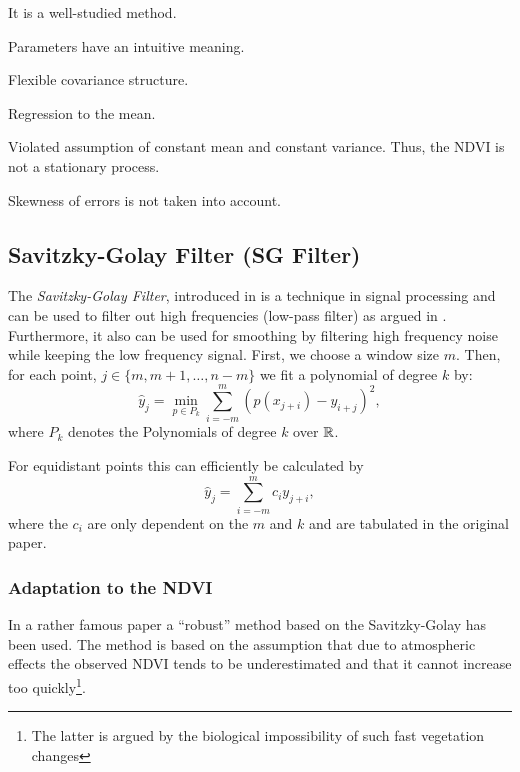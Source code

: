 \begin{my_pros_cons_table}{
    \item It is a well-studied method.
    \item Parameters have an intuitive meaning.
    \item Flexible covariance structure.
  }{
    \item Regression to the mean.
    \item Violated assumption of constant mean and constant variance. Thus, the NDVI is not a stationary process.
    \item Skewness of errors is not taken into account.
  }
\end{my_pros_cons_table}


\subsection{Savitzky-Golay Filter (SG Filter)}
\label{sec:Savitzky–Golay}
The \textit{Savitzky-Golay Filter}, introduced in \cite{savitzkySmoothingDifferentiationData1964} is a technique in signal processing and can be used to filter out high frequencies (low-pass filter) as argued in \cite{schaferWhatSavitzkyGolayFilter2011}. Furthermore, it also can be used for smoothing by filtering high frequency noise while keeping the low frequency signal.
First, we choose a window size $m$. Then, for each point, $j \in \{m, m+1, \dots, n-m\}$ we fit a polynomial of degree $k$ by:
$$\hat y_j=\min_{p\in P_k}\sum_{i=-m}^{m}(p (x_{j+i})-y_{i+j})^{2},$$
where $P_k$ denotes the Polynomials of degree $k$ over $\mathbb{R}$.

For equidistant points this can efficiently be calculated by
$$
  \hat y_{j}=\sum_{i=-m}^{m} c_{i} y_{j+i},
$$
where the $c_i$ are only dependent on the $m$ and $k$ and are tabulated in the original paper.

\subsubsection*{Adaptation to the NDVI}
In a rather famous paper \cite{chenSimpleMethodReconstructing2004a} a ``robust'' method based on the Savitzky-Golay has been used.
The method is based on the assumption that due to atmospheric effects the observed NDVI tends to be underestimated and that it cannot increase too quickly\footnote{The latter is argued by the biological impossibility of such fast vegetation changes}.

